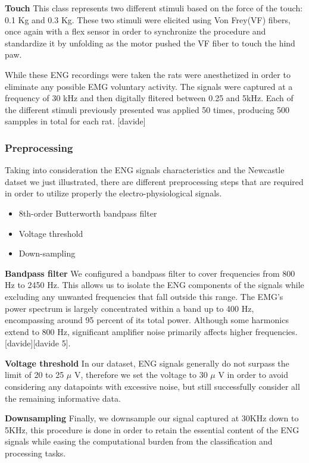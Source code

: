 \documentclass{Configuration_Files/PoliMi3i_thesis}
\begin{document}
\textbf{Touch} \quad This class represents two different stimuli based on the force of the touch: 0.1 Kg and 0.3 Kg.
These two stimuli were elicited using Von Frey(VF) fibers, once again with a flex sensor in order to synchronize the procedure and standardize it by unfolding as the motor pushed the VF fiber to touch the hind paw.

While these ENG recordings were taken the rats were anesthetized in order to eliminate any possible EMG voluntary activity. The signals were captured at a frequency of 30 kHz and then digitally flitered between 0.25 and 5kHz.
Each of the different stimuli previously presented was applied 50 times, producing 500 sampples in total for each rat. [davide]

\subsubsection{Preprocessing}

Taking into consideration the ENG signals characteristics and the Newcastle datset we just illustrated, there are different preprocessing steps that are required in order to utilize properly the electro-physiological signals.

\begin{itemize}
	\item 8th-order Butterworth bandpass filter
	\item Voltage threshold
	\item Down-sampling
\end{itemize}

\textbf{Bandpass filter} \quad We configured a bandpass filter to cover frequencies from 800 Hz to 2450 Hz. This allows us to isolate the ENG components of the signals while excluding any unwanted frequencies that fall outside this range. The EMG's power spectrum is largely concentrated within a band up to 400 Hz, encompassing around 95 percent of its total power. Although some harmonics extend to 800 Hz, significant amplifier noise primarily affects higher frequencies. [davide][davide 5].

\textbf{Voltage threshold} \quad In our dataset, ENG signals generally do not surpass the limit of 20 to 25 \(\mu \) V, therefore we set the voltage to 30 \(\mu \) V in order to avoid considering any datapoints with excessive noise, but still successfully consider all the remaining informative data.

\textbf{Downsampling} \quad Finally, we downsample our signal captured at 30KHz down to 5KHz, this procedure is done in order to retain the essential content of the ENG signals while easing the computational burden from the classification and processing tasks.
\end{document}
